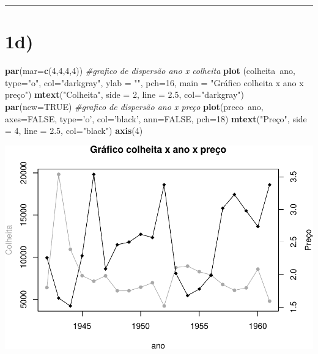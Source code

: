 \documentclass[11pt,]{article}
\makeatletter
\newenvironment{Shaded}{\begin{snugshade}}{\end{snugshade}}
\newcommand{\KeywordTok}[1]{\textcolor[rgb]{0.13,0.29,0.53}{\textbf{{#1}}}}
\newcommand{\DataTypeTok}[1]{\textcolor[rgb]{0.13,0.29,0.53}{{#1}}}
\newcommand{\DecValTok}[1]{\textcolor[rgb]{0.00,0.00,0.81}{{#1}}}
\newcommand{\FloatTok}[1]{\textcolor[rgb]{0.00,0.00,0.81}{{#1}}}
\newcommand{\StringTok}[1]{\textcolor[rgb]{0.31,0.60,0.02}{{#1}}}
\newcommand{\CommentTok}[1]{\textcolor[rgb]{0.56,0.35,0.01}{\textit{{#1}}}}
\newcommand{\OtherTok}[1]{\textcolor[rgb]{0.56,0.35,0.01}{{#1}}}
\newcommand{\NormalTok}[1]{{#1}}
\def\maxwidth{\ifdim\Gin@nat@width>\linewidth\linewidth
\else\Gin@nat@width\fi}
\let\Oldincludegraphics\includegraphics
\renewcommand{\includegraphics}[1]{\Oldincludegraphics[width=\maxwidth]{#1}}
\makeatother
\begin{document}
\begin{center}\rule{0.5\linewidth}{\linethickness}\end{center}

\section{1d)}\label{d}

\begin{Shaded}
\begin{Highlighting}[]
\KeywordTok{par}\NormalTok{(}\DataTypeTok{mar=}\KeywordTok{c}\NormalTok{(}\DecValTok{4}\NormalTok{,}\DecValTok{4}\NormalTok{,}\DecValTok{4}\NormalTok{,}\DecValTok{4}\NormalTok{))}
\CommentTok{#grafico de dispersão ano x colheita}
\KeywordTok{plot} \NormalTok{(colheita~ano, }\DataTypeTok{type=}\StringTok{"o"}\NormalTok{, }\DataTypeTok{col=}\StringTok{"darkgray"}\NormalTok{, }\DataTypeTok{ylab =} \StringTok{""}\NormalTok{, }\DataTypeTok{pch=}\DecValTok{16}\NormalTok{,}
      \DataTypeTok{main =} \StringTok{"Gráfico colheita x ano x preço"}\NormalTok{)}
\KeywordTok{mtext}\NormalTok{(}\StringTok{"Colheita"}\NormalTok{, }\DataTypeTok{side =} \DecValTok{2}\NormalTok{, }\DataTypeTok{line =} \FloatTok{2.5}\NormalTok{, }\DataTypeTok{col=}\StringTok{"darkgray"}\NormalTok{)}
\KeywordTok{par}\NormalTok{(}\DataTypeTok{new=}\OtherTok{TRUE}\NormalTok{)}
\CommentTok{#grafico de dispersão ano x preço}
\KeywordTok{plot}\NormalTok{(preco~ano, }\DataTypeTok{axes=}\OtherTok{FALSE}\NormalTok{, }\DataTypeTok{type=}\StringTok{'o'}\NormalTok{, }\DataTypeTok{col=}\StringTok{'black'}\NormalTok{, }\DataTypeTok{ann=}\OtherTok{FALSE}\NormalTok{, }\DataTypeTok{pch=}\DecValTok{18}\NormalTok{)}
\KeywordTok{mtext}\NormalTok{(}\StringTok{"Preço"}\NormalTok{, }\DataTypeTok{side =} \DecValTok{4}\NormalTok{, }\DataTypeTok{line =} \FloatTok{2.5}\NormalTok{, }\DataTypeTok{col=}\StringTok{"black"}\NormalTok{)}
\KeywordTok{axis}\NormalTok{(}\DecValTok{4}\NormalTok{)}
\end{Highlighting}
\end{Shaded}

\includegraphics{versaofinal_lista3_files/figure-latex/unnamed-chunk-5-1.pdf}
\end{document}
